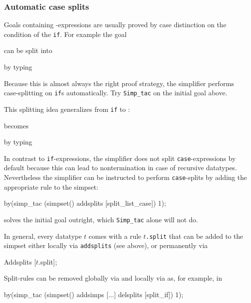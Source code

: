 \subsubsection{Automatic case splits}

Goals containing -expressions are usually proved by case
distinction on the condition of the \texttt{if}. For example the goal
\begin{ttbox}
\end{ttbox}
can be split into
\begin{ttbox}
\end{ttbox}
by typing
\begin{ttbox}
\end{ttbox}
Because this is almost always the right proof strategy, the simplifier
performs case-splitting on \texttt{if}s automatically. Try \texttt{Simp_tac}
on the initial goal above.

This splitting idea generalizes from \texttt{if} to :
\begin{ttbox}\makeatother
{}
\end{ttbox}
becomes
\begin{ttbox}\makeatother
{}
\end{ttbox}
by typing
\begin{ttbox}
\end{ttbox}
In contrast to \texttt{if}-expressions, the simplifier does not split
\texttt{case}-expressions by default because this can lead to nontermination
in case of recursive datatypes.
Nevertheless the simplifier can be instructed to perform \texttt{case}-splits
by adding the appropriate rule to the simpset:
\begin{ttbox}
by(simp_tac (simpset() addsplits [split_list_case]) 1);
\end{ttbox}
solves the initial goal outright, which \texttt{Simp_tac} alone will not do.

In general, every datatype $t$ comes with a rule
\texttt{$t$.split} that can be added to the simpset either
locally via \texttt{addsplits} (see above), or permanently via
\begin{ttbox}
Addsplits [\(t\).split];
\end{ttbox}
Split-rules can be removed globally via  and locally
via  as, for example, in
\begin{ttbox}
by(simp_tac (simpset() addsimps [\(\dots\)] delsplits [split_if]) 1);
\end{ttbox}


